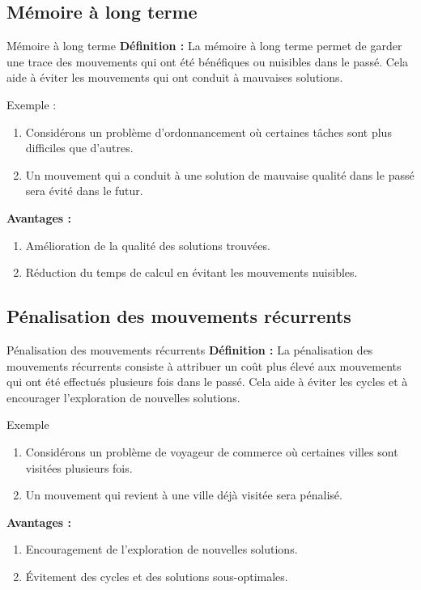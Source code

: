 \documentclass[10pt, handout]{beamer}
\begin{document}
\subsection{Mémoire à long terme}
\begin{frame}{Mémoire à long terme}
    \textbf{Définition :}
    La mémoire à long terme permet de garder une trace des mouvements qui ont été bénéfiques ou nuisibles dans le passé. Cela aide à éviter les mouvements qui ont conduit à mauvaises solutions.

    \bigskip

    \begin{exampleblock}{Exemple :}
        \begin{enumerate}
            \item Considérons un problème d'ordonnancement où certaines tâches sont plus
                  difficiles que d'autres.
            \item Un mouvement qui a conduit à une solution de mauvaise qualité dans le passé
                  sera évité dans le futur.
        \end{enumerate}
    \end{exampleblock}
    \bigskip
    \textbf{Avantages :}
    \begin{enumerate}
        \item Amélioration de la qualité des solutions trouvées.
        \item Réduction du temps de calcul en évitant les mouvements nuisibles.
    \end{enumerate}
\end{frame}

\subsection{Pénalisation des mouvements récurrents}
\begin{frame}{Pénalisation des mouvements récurrents}
    \textbf{Définition :}
    La pénalisation des mouvements récurrents consiste à attribuer un coût plus élevé aux mouvements qui ont été effectués plusieurs fois dans le passé. Cela aide à éviter les cycles et à encourager l'exploration de nouvelles solutions.

    \bigskip

    \begin{exampleblock}{Exemple}
        \begin{enumerate}
            \item Considérons un problème de voyageur de commerce où certaines villes sont
                  visitées plusieurs fois.
            \item Un mouvement qui revient à une ville déjà visitée sera pénalisé.
        \end{enumerate}
    \end{exampleblock}
    \bigskip
    \textbf{Avantages :}
    \begin{enumerate}
        \item Encouragement de l'exploration de nouvelles solutions.
        \item Évitement des cycles et des solutions sous-optimales.
    \end{enumerate}
\end{frame}
\end{document}
